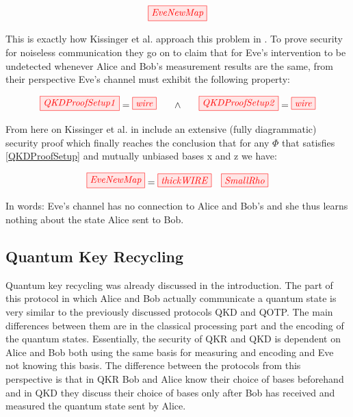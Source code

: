 \documentclass[]{article}
\begin{document}
\begin{equation}
	\label{equation:EveNewMap}
	\tikzfig{EveNewMap}
\end{equation}

This is exactly how Kissinger et al. approach this problem in \cite{Kissinger2017}. To prove security for noiseless communication they go on to claim that for Eve's intervention to be undetected whenever Alice and Bob's measurement results are the same, from their perspective Eve's channel must exhibit the following property:

\begin{equation}
	\label{QKDProofSetup}
	\tikzfig{QKDProofSetup1} = \tikzfig{wire} ~~~~~ \land ~~~~~ \tikzfig{QKDProofSetup2} = \tikzfig{wire}
\end{equation}

From here on Kissinger et al. in \cite{Kissinger2017} include an extensive (fully diagrammatic) security proof which finally reaches the conclusion that for any $\Phi$ that satisfies \ref{QKDProofSetup} and mutually unbiased bases x and z we have:

\begin{equation}
\tikzfig{EveNewMap} = \tikzfig{thickWIRE} ~~~ \tikzfig{SmallRho}
\end{equation}

In words: Eve's channel has no connection to Alice and Bob's and she thus learns nothing about the state Alice sent to Bob.


\subsection{Quantum Key Recycling}
\label{section:qkr}

Quantum key recycling was already discussed in the introduction. The part of this protocol in which Alice and Bob actually communicate a quantum state is very similar to the previously discussed protocols QKD and QOTP. The main differences between them are in the classical processing part and the encoding of the quantum states. Essentially, the security of QKR and QKD is dependent on Alice and Bob both using the same basis for measuring and encoding and Eve not knowing this basis. The difference between the protocols from this perspective is that in QKR Bob and Alice know their choice of bases beforehand and in QKD they discuss their choice of bases only after Bob has received and measured the quantum state sent by Alice.
\end{document}
